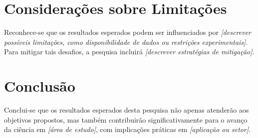 \section{Considerações sobre Limitações}

Reconhece-se que os resultados esperados podem ser influenciados por \textit{[descrever possíveis limitações, como disponibilidade de dados ou restrições experimentais]}. Para mitigar tais desafios, a pesquisa incluirá \textit{[descrever estratégias de mitigação]}.

\section{Conclusão}

Conclui-se que os resultados esperados desta pesquisa não apenas atenderão aos objetivos propostos, mas também contribuirão significativamente para o avanço da ciência em \textit{[área de estudo]}, com implicações práticas em \textit{[aplicação ou setor]}.

